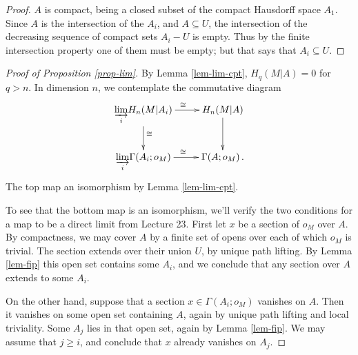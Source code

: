\begin{proof}
$A$ is compact, being a closed subset of the compact Hausdorff space $A_1$.
Since $A$ is the intersection of the $A_i$, and $A\subseteq U$, 
the intersection of the decreasing sequence of compact sets $A_i-U$ is empty. 
Thus by the finite intersection property one of them must be empty;
but that says that $A_i\subseteq U$. 
\end{proof}
\begin{proof}[Proof of Proposition \ref{prop-lim}]
By Lemma \ref{lem-lim-cpt},
$H_q(M|A)=0$ for $q>n$. In dimension $n$, we contemplate 
the commutative diagram 
\[
\xymatrix{
\displaystyle{\varinjlim_i}H_n(M|A_i) \ar[r]^\cong \ar[d]^\cong & 
H_n(M|A) \ar[d] \\
\displaystyle{\varinjlim_i}\Gamma(A_i;o_M) \ar[r]^\cong & \Gamma(A;o_M) \,.
}\]
The top map an isomorphism by Lemma \ref{lem-lim-cpt}.

To see that the bottom map is an isomorphism, we'll verify the two 
conditions for a map to be a direct limit from Lecture 23.
First let $x$ be a section
of $o_M$ over $A$. By compactness, we may cover $A$ by a finite set of 
opens over each of which $o_M$ is trivial. 
The section extends over their union $U$, by unique path 
lifting. By Lemma \ref{lem-fip} this open set contains some $A_i$, 
and we conclude that any section over $A$ extends to some $A_i$. 

On the other hand, suppose that a section $x\in\Gamma(A_i;o_M)$ 
vanishes on $A$. Then it vanishes on some open set containing $A$,
again by unique path lifting and local triviality. Some $A_j$ lies
in that open set, again by Lemma \ref{lem-fip}. We may assume that 
$j\geq i$, and conclude that $x$ already vanishes on $A_j$.
\end{proof}

